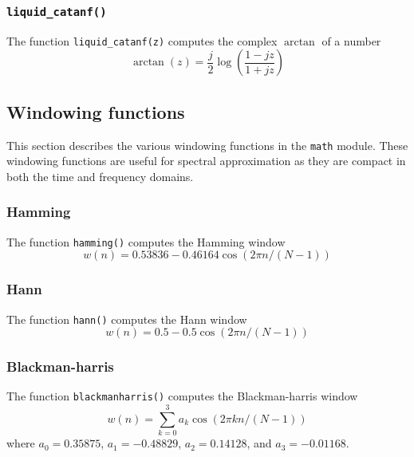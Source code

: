 \subsubsection{{\tt liquid\_catanf()}}
\label{module:math:complex:catanf}
The function {\tt liquid\_catanf(z)}
computes the complex $\arctan$ of a number
%
\begin{equation}
\label{eqn:math:catanf}
    \arctan(z) =
        \frac{j}{2}
        \log\left( \frac{1-jz}{1+jz} \right)
\end{equation}
%


% 
%
\subsection{Windowing functions}
\label{module:math:window}
This section describes the various windowing functions in the {\tt math}
module.
These windowing functions are useful for spectral approximation as they
are compact in both the time and frequency domains.

\subsubsection{Hamming}
\label{module:math:window:hamming}
The function {\tt hamming()} computes the Hamming window
%
\begin{equation}
\label{eqn:math:window:hamming}
    w(n) = 0.53836 - 0.46164 \cos\left( 2 \pi n / (N-1) \right)
\end{equation}
%

\subsubsection{Hann}
\label{module:math:window:hann}
The function {\tt hann()} computes the Hann window
%
\begin{equation}
\label{eqn:math:window:hann}
    w(n) = 0.5 - 0.5 \cos\left( 2 \pi n / (N-1) \right)
\end{equation}
%

\subsubsection{Blackman-harris}
\label{module:math:window:blackmanharris}
The function {\tt blackmanharris()}
    computes the Blackman-harris window
%
\begin{equation}
\label{eqn:math:window:blackmanharris}
    w(n) = \sum_{k=0}^{3} { a_k \cos\left( 2 \pi k n / (N-1)\right) }
\end{equation}
%
where
$a_0 =  0.35875$,
$a_1 = -0.48829$,
$a_2 =  0.14128$, and
$a_3 = -0.01168$.

